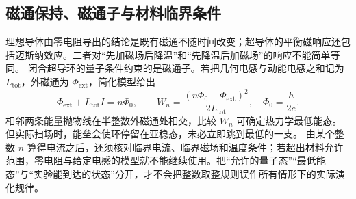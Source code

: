 \subsection{磁通保持、磁通子与材料临界条件}
理想导体由零电阻导出的结论是既有磁通不随时间改变；超导体的平衡磁响应还包括迈斯纳效应。二者对“先加磁场后降温”和“先降温后加磁场”的响应不能简单等同。
闭合超导环的量子条件约束的是磁通子。若把几何电感与动能电感之和记为 $L_{\mathrm{tot}}$，外磁通为 $\Phi_{\mathrm{ext}}$，简化模型给出
\[
 \Phi_{\mathrm{ext}}+L_{\mathrm{tot}}I=n\Phi_0,\qquad
 W_n=\frac{(n\Phi_0-\Phi_{\mathrm{ext}})^2}{2L_{\mathrm{tot}}},\quad
 \Phi_0=\frac{h}{2e}.
\]
相邻两条能量抛物线在半整数外磁通处相交，比较 $W_n$ 可确定热力学最低能态。但实际扫场时，能垒会使环停留在亚稳态，未必立即跳到最低的一支。
由某个整数 $n$ 算得电流之后，还须核对临界电流、临界磁场和温度条件；若超出材料允许范围，零电阻与给定电感的模型就不能继续使用。把“允许的量子态”“最低能态”与“实验能到达的状态”分开，才不会把整数取整规则误作所有情形下的实际演化规律。

